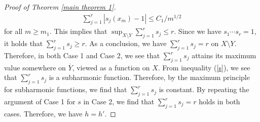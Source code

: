 \documentclass[12pt]{article}
\theoremstyle{definition}
\begin{document}
\begin{proof}[Proof of Theorem \ref{main theorem 1}]
\begin{align*}
\sum_{j=1}^r|s_j(x_m)-1|\leq C_1/m^{1/2}
\end{align*}
for all $m\geq m_1$. This implies that $\sup_{X\setminus Y}\sum_{j=1}^rs_j\leq r$. Since we have $s_1\cdots s_r=1$, it holds that $\sum_{j=1}^rs_j\geq r$. As a conclusion, we have $\sum_{j=1}^r s_j = r$ on $X \setminus Y$.
Therefore, in both Case 1 and Case 2, we see that $\sum_{j=1}^r s_j$ attains its maximum value somewhere on $\overline{Y}$, viewed as a function on $X$. From inequality (\ref{s}), we see that $\sum_{j=1}^r s_j$ is a subharmonic function. Therefore, by the maximum principle for subharmonic functions, we find that $\sum_{j=1}^r s_j$ is constant.
By repeating the argument of Case 1 for $s$ in Case 2, we find that $\sum_{j=1}^r s_j = r$ holds in both cases. Therefore, we have $h = h'$.
\end{proof}
\end{document}
